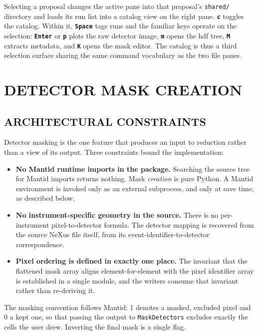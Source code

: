 \documentclass[tm]{ornltm}
\newcommand{\key}[1]{\textbf{\texttt{#1}}}
\begin{document}
Selecting a proposal changes the active pane into that proposal's
\texttt{shared/} directory and loads its run list into a catalog view on the
right pane. \key{c} toggles the catalog. Within it, \key{Space} tags runs and the
familiar keys operate on the selection: \key{Enter} or \key{p} plots the raw
detector image, \key{m} opens the \ac{hdf} tree, \key{M} extracts metadata, and
\key{K} opens the mask editor. The catalog is thus a third selection surface
sharing the same command vocabulary as the two file panes.

\section{DETECTOR MASK CREATION}
\label{sec:mask}

\subsection{ARCHITECTURAL CONSTRAINTS}

Detector masking is the one feature that produces an input to reduction rather
than a view of its output. Three constraints bound the implementation:

\begin{itemize}
  \item \textbf{No Mantid runtime imports in the package.} Searching the source
    tree for Mantid imports returns nothing. Mask \emph{creation} is pure Python.
    A Mantid environment is invoked only as an external subprocess, and only at
    save time, as described below.
  \item \textbf{No instrument-specific geometry in the source.} There is no
    per-instrument pixel-to-detector formula. The detector mapping is recovered
    from the source NeXus file itself, from its event-identifier-to-detector
    correspondence.
  \item \textbf{Pixel ordering is defined in exactly one place.} The invariant
    that the flattened mask array aligns element-for-element with the pixel
    identifier array is established in a single module, and the writers consume
    that invariant rather than re-deriving it.
\end{itemize}

The masking convention follows Mantid: 1 denotes a masked, excluded pixel and 0 a
kept one, so that passing the output to \texttt{MaskDetectors} excludes exactly
the cells the user drew. Inverting the final mask is a single flag.
\end{document}

